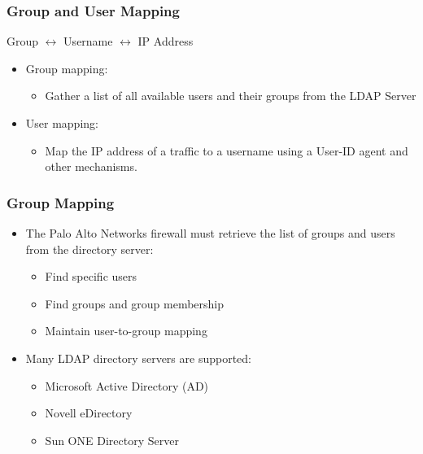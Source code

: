\subsubsection{Group and User Mapping}
Group $\leftrightarrow$ Username $\leftrightarrow$ IP Address
\begin{itemize}
    \item Group mapping:
        \begin{itemize}
            \item Gather a list of all available users and their groups from the LDAP Server
        \end{itemize}
    \item User mapping:
        \begin{itemize}
            \item Map the IP address of a traffic to a username using a User-ID agent and other mechanisms.
        \end{itemize}
\end{itemize}

\subsubsection{Group Mapping}
\begin{itemize}
    \item The Palo Alto Networks firewall must retrieve the list of groups and users from the directory server:
        \begin{itemize}
            \item Find specific users
            \item Find groups and group membership
            \item Maintain user-to-group mapping
        \end{itemize}
    \item Many LDAP directory servers are supported:
        \begin{itemize}
            \item Microsoft Active Directory (AD)
            \item Novell eDirectory
            \item Sun ONE Directory Server
        \end{itemize}
\end{itemize}

